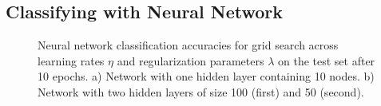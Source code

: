 \subsection{Classifying with Neural Network}
\begin{figure}[H]
    \centering
    \caption{
	Neural network classification accuracies for grid search across 
	learning rates $\eta$ and regularization parameters $\lambda$ on 
	the test set after 10 epochs.
	a) Network with one hidden layer containing 10 nodes. 
	b) Network with two hidden layers of size 100 (first) and 50
	(second). 
	}
    \label{fig:nn-test}
\end{figure}
